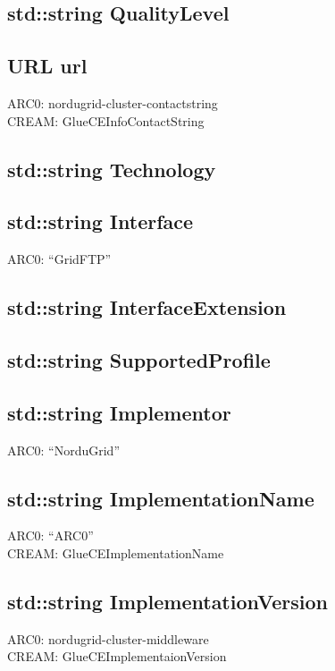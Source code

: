 \documentclass{book}
\begin{document}
\subsection*{std::string QualityLevel}

\subsection*{URL url}

ARC0: nordugrid-cluster-contactstring \\
CREAM: GlueCEInfoContactString

\subsection*{std::string Technology}

\subsection*{std::string Interface}

ARC0: ``GridFTP''

\subsection*{std::string InterfaceExtension}

\subsection*{std::string SupportedProfile}

\subsection*{std::string Implementor}

ARC0: ``NorduGrid''

\subsection*{std::string ImplementationName}

ARC0: ``ARC0'' \\
CREAM: GlueCEImplementationName

\subsection*{std::string ImplementationVersion}

ARC0: nordugrid-cluster-middleware \\
CREAM: GlueCEImplementaionVersion
\end{document}
